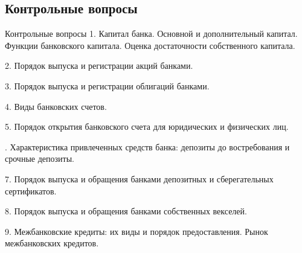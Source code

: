 \documentclass[_Banking_p2.tex]{subfiles}
\begin{document}
\subsection{Контрольные вопросы}
\begin{frame}[ allowframebreaks ]{Контрольные вопросы}
1. Капитал банка. Основной и дополнительный капитал. Функции банковского капитала. Оценка достаточности собственного капитала.

2. Порядок выпуска и регистрации акций банками.

3. Порядок выпуска и регистрации облигаций банками.

4. Виды банковских счетов.

5. Порядок открытия банковского счета для юридических и физических лиц.

. Характеристика привлеченных средств банка: депозиты до востребования и срочные депозиты.

7. Порядок выпуска и обращения банками депозитных и сберегательных сертификатов.

8. Порядок выпуска и обращения банками собственных векселей.

9. Межбанковские кредиты: их виды и порядок предоставления. Рынок межбанковских кредитов.
\end{frame}

\end{document}
